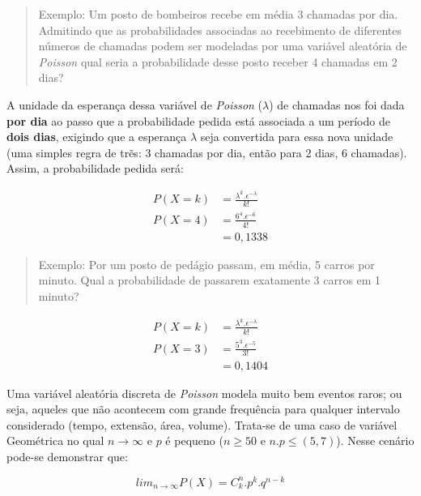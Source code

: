\documentclass[
]{book}
\begin{document}
\begin{quote}
Exemplo: Um posto de bombeiros recebe em média 3 chamadas por dia. Admitindo que as probabilidades associadas ao recebimento de diferentes números de chamadas podem ser modeladas por uma variável aleatória de \emph{Poisson} qual seria a probabilidade desse posto receber 4 chamadas em 2 dias?
\end{quote}

\hfill\break

A unidade da esperança dessa variável de \emph{Poisson} (\(\lambda\)) de chamadas nos foi dada \textbf{por dia} ao passo que a probabilidade pedida está associada a um período de \textbf{dois dias}, exigindo que a esperança \(\lambda\) seja convertida para essa nova unidade (uma simples regra de trẽs: 3 chamadas por dia, então para 2 dias, 6 chamadas). Assim, a probabilidade pedida será:

\hfill\break

\begin{align*}
P(X=k) & = \frac{\lambda ^{k}. \epsilon^{-\lambda}} {k!}\\
P(X=4) & = \frac{6^{4}. \epsilon^{-6}} {4!} \\
       & = 0,1338
\end{align*}

\hfill\break

\begin{quote}
Exemplo: Por um posto de pedágio passam, em média, 5 carros por minuto. Qual a probabilidade de passarem exatamente 3 carros em 1 minuto?
\end{quote}

\hfill\break

\begin{align*}
P(X=k) & = \frac{\lambda ^{k}. \epsilon^{-\lambda}} {k!} \\
P(X=3) & = \frac{5^{3}. \epsilon^{-5}} {3!} \\
       & = 0,1404
\end{align*}

Uma variável aleatória discreta de \emph{Poisson} modela muito bem eventos raros; ou seja, aqueles que não acontecem com grande frequência para qualquer intervalo considerado (tempo, extensão, área, volume). Trata-se de uma caso de variável Geométrica no qual \(n \to \infty\) e \(p\) é pequeno (\(n \geq 50\) e \(n . p \leq (5,7)\)). Nesse cenário pode-se demonstrar que:

\hfill\break

\[
lim_{n \to \infty} P(X) = {C}_{k}^{n}. {p}^{k}. {q}^{n-k}
\]
\end{document}
